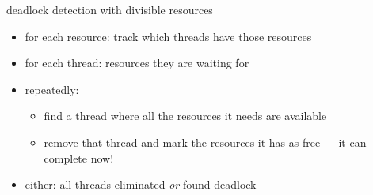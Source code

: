 \begin{frame}{deadlock detection with divisible resources}
    \begin{itemize}
    \item for each resource: track which threads have those resources
    \item for each thread: resources they are waiting for
    \item repeatedly:
        \begin{itemize}
        \item find a thread where all the resources it needs are available
        \item remove that thread and mark the resources it has as free --- it can complete now!
        \end{itemize}
    \item either: all threads eliminated \textit{or} found deadlock
    \end{itemize}
\end{frame}
